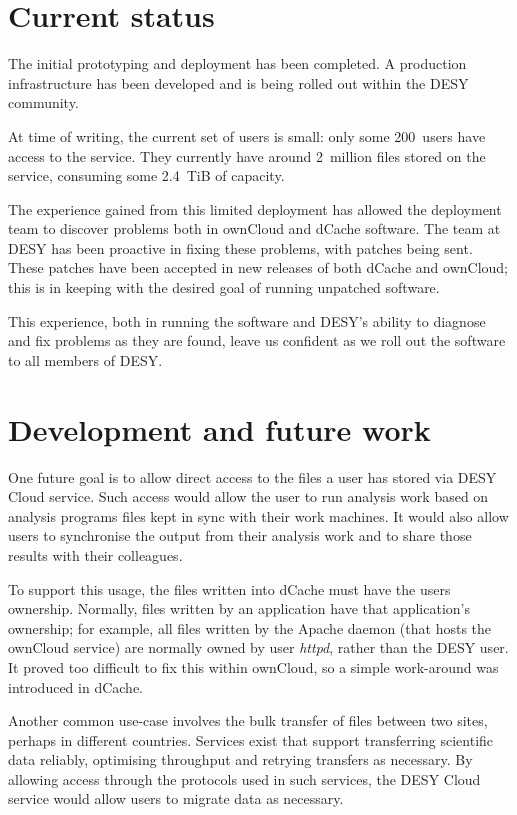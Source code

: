 \documentclass[a4paper]{jpconf}
\begin{document}
\section{Current status}

The initial prototyping and deployment has been completed.  A
production infrastructure has been developed and is being rolled out
within the DESY community.

At time of writing, the current set of users is small: only some
200~users have access to the service.  They currently have around
2~million files stored on the service, consuming some 2.4~TiB of
capacity.

The experience gained from this limited deployment has allowed the
deployment team to discover problems both in ownCloud and dCache
software.  The team at DESY has been proactive in fixing these
problems, with patches being sent.  These patches have been accepted
in new releases of both dCache and ownCloud; this is in keeping with
the desired goal of running unpatched software.

This experience, both in running the software and DESY's ability to
diagnose and fix problems as they are found, leave us confident as we
roll out the software to all members of DESY.

\section{Development and future work}

One future goal is to allow direct access to the files a user has
stored via DESY Cloud service.  Such access would allow the user to
run analysis work based on analysis programs files kept in sync with
their work machines.  It would also allow users to synchronise the
output from their analysis work and to share those results with their
colleagues.

To support this usage, the files written into dCache must have the
users ownership.  Normally, files written by an application have that
application's ownership; for example, all files written by the Apache
daemon (that hosts the ownCloud service) are normally owned by user
{\em httpd}, rather than the DESY user.  It proved too difficult to
fix this within ownCloud, so a simple work-around was introduced in
dCache.

Another common use-case involves the bulk transfer of files between
two sites, perhaps in different countries.  Services
exist\cite{fts-website}\cite{globus-website} that support transferring
scientific data reliably, optimising throughput and retrying transfers
as necessary.  By allowing access through the protocols used in such
services, the DESY Cloud service would allow users to migrate data as
necessary.
\end{document}
